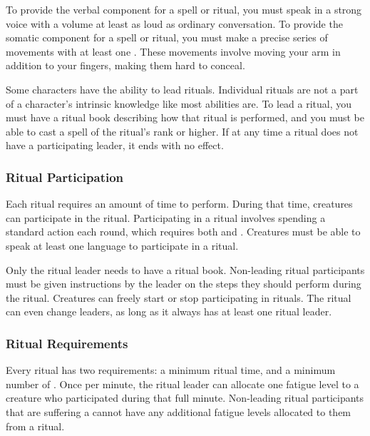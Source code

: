     To provide the verbal component for a spell or ritual, you must speak in a strong voice with a volume at least as loud as ordinary conversation.
    To provide the somatic component for a spell or ritual, you must make a precise series of movements with at least one .
    These movements involve moving your arm in addition to your fingers, making them hard to conceal.

    Some characters have the ability to lead rituals.
    Individual rituals are not a part of a character's intrinsic knowledge like most abilities are.
    To lead a ritual, you must have a ritual book describing how that ritual is performed, and you must be able to cast a spell of the ritual's rank or higher.
    If at any time a ritual does not have a participating leader, it ends with no effect.

    \subsubsection{Ritual Participation}
      Each ritual requires an amount of time to perform.
      During that time, creatures can participate in the ritual.
      Participating in a ritual involves spending a standard action each round, which requires both  and .
      Creatures must be able to speak at least one language to participate in a ritual.

      Only the ritual leader needs to have a ritual book.
      Non-leading ritual participants must be given instructions by the leader on the steps they should perform during the ritual.
      Creatures can freely start or stop participating in rituals.
      The ritual can even change leaders, as long as it always has at least one ritual leader.

    \subsubsection{Ritual Requirements}\label{Ritual Requirements}
      Every ritual has two requirements: a minimum ritual time, and a minimum number of .
      Once per minute, the ritual leader can allocate one fatigue level to a creature who participated during that full minute.
      Non-leading ritual participants that are suffering a  cannot have any additional fatigue levels allocated to them from a ritual.

